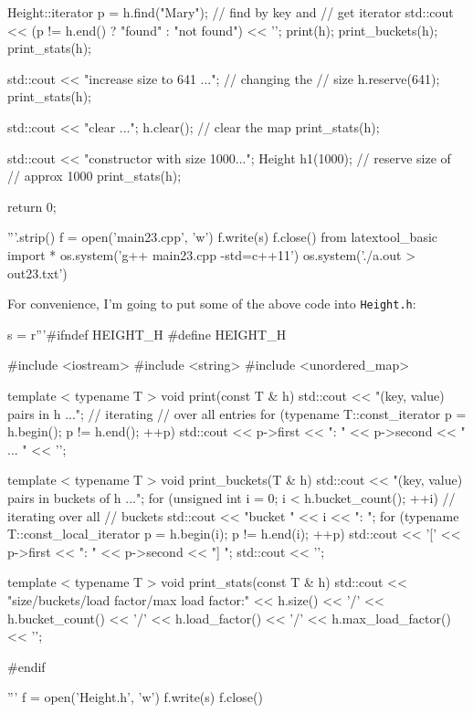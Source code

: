 \begin{python}
{    Height::iterator p = h.find("Mary"); // find by key and
                                     // get iterator
    std::cout << (p != h.end() ? "found" : "not found")
              << '\n';
    print(h);
    print_buckets(h);
    print_stats(h);

    std::cout << "increase size to 641 ...\n"; // changing the
                                     // size
    h.reserve(641);
    print_stats(h);

    std::cout << "clear ...\n";           
    h.clear();                       // clear the map
    print_stats(h);

    std::cout << "constructor with size 1000...\n";
    Height h1(1000);                 // reserve size of
                                     // approx 1000
    print_stats(h);
    
    return 0;
}
'''.strip()
f = open('main23.cpp', 'w')
f.write(s)
f.close()
from latextool_basic import *
os.system('g++ main23.cpp -std=c++11')
os.system('./a.out > out23.txt')
\end{python}
\vspace{-0.1cm}
{\small
{}
}

For convenience, I'm going to put some of the above code
into \verb!Height.h!:

\begin{python}
s = r'''#ifndef HEIGHT_H
#define HEIGHT_H

#include <iostream>
#include <string>
#include <unordered_map>

template < typename T >
void print(const T & h)
{
    std::cout << "(key, value) pairs in h ...\n"; // iterating
                                     // over all entries
    for (typename T::const_iterator p = h.begin();
         p != h.end(); ++p)
    {
        std::cout << p->first << ": " << p->second
                  << " ... "
                  << '\n';
    }
}

template < typename T >
void print_buckets(T & h)
{
    std::cout << "(key, value) pairs in buckets of h ...\n"; 
    for (unsigned int i = 0; i < h.bucket_count(); ++i)
                                     // iterating over all
                                     // buckets
    {
        std::cout << "bucket " << i << ": ";
        for (typename T::const_local_iterator p = h.begin(i);
             p != h.end(i); ++p)
        {
            std::cout << '['
                      << p->first << ": " << p->second
                      << "] ";
        }
        std::cout << '\n';
    }
}

template < typename T >
void print_stats(const T & h)
{
    std::cout << "size/buckets/load factor/max load factor:"
              << h.size() << '/'
              << h.bucket_count() << '/'
              << h.load_factor() << '/'
              << h.max_load_factor() << '\n';
}

#endif

'''
f = open('Height.h', 'w')
f.write(s)
f.close()
\end{python}
\vspace{-0.1cm}
{\small
{}
}

